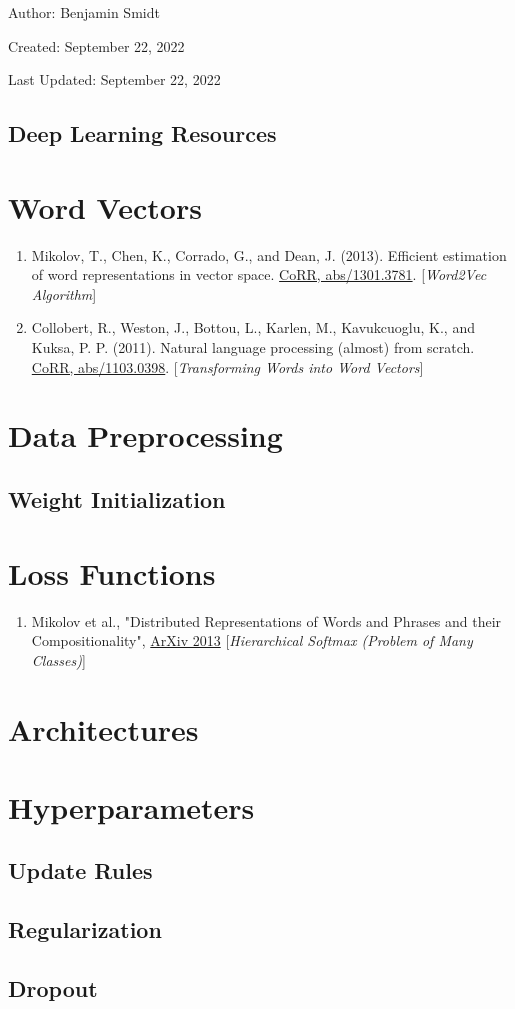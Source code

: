 \documentclass[12pt]{article}
\begin{document}
\noindent Author: Benjamin Smidt

\noindent Created: September 22, 2022

\noindent Last Updated: September 22, 2022
\begin{center}
\section*{Deep Learning Resources}
\end{center}

\tableofcontents{}

\section{Word Vectors}
\begin{enumerate}
\item Mikolov, T., Chen, K., Corrado, G., and Dean, J. (2013). 
    Efficient estimation of word representations in vector space. 
    \href{https://arxiv.org/abs/1301.3781}{CoRR, abs/1301.3781}. 
    [\emph{Word2Vec Algorithm}]
\item Collobert, R., Weston, J., Bottou, L., Karlen, M., Kavukcuoglu, K., and Kuksa, P. P. 
    (2011). Natural language processing (almost) from scratch. 
    \href{https://arxiv.org/abs/1103.0398}{CoRR, abs/1103.0398}.
    [\emph{Transforming Words into Word Vectors}]
\end{enumerate}

\section{Data Preprocessing}

\subsection{Weight Initialization}

\section{Loss Functions}
\begin{enumerate}
\item Mikolov et al., 
    "Distributed Representations of Words and Phrases and their
    Compositionality", 
    \href{https://arxiv.org/abs/1310.4546}{ArXiv 2013}
    [\emph{Hierarchical Softmax (Problem of Many Classes)}]
\end{enumerate}


\section{Architectures}

\section{Hyperparameters}
\subsection{Update Rules}

\subsection{Regularization}

\subsection{Dropout}
\end{document}
